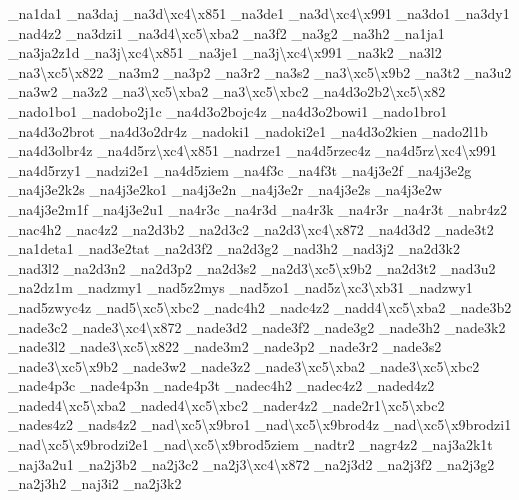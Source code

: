 \begin{DoxyCompactItemize}
\-\_\-na1da1 \-\_\-na3daj \-\_\-na3d\textbackslash{}xc4\textbackslash{}x851 \-\_\-na3de1 \-\_\-na3d\textbackslash{}xc4\textbackslash{}x991 \-\_\-na3do1 \-\_\-na3dy1 \-\_\-nad4z2 \-\_\-na3dzi1 \-\_\-na3d4\textbackslash{}xc5\textbackslash{}xba2 \-\_\-na3f2 \-\_\-na3g2 \-\_\-na3h2 \-\_\-na1ja1 \-\_\-na3ja2z1d \-\_\-na3j\textbackslash{}xc4\textbackslash{}x851 \-\_\-na3je1 \-\_\-na3j\textbackslash{}xc4\textbackslash{}x991 \-\_\-na3k2 \-\_\-na3l2 \-\_\-na3\textbackslash{}xc5\textbackslash{}x822 \-\_\-na3m2 \-\_\-na3p2 \-\_\-na3r2 \-\_\-na3s2 \-\_\-na3\textbackslash{}xc5\textbackslash{}x9b2 \-\_\-na3t2 \-\_\-na3u2 \-\_\-na3w2 \-\_\-na3z2 \-\_\-na3\textbackslash{}xc5\textbackslash{}xba2 \-\_\-na3\textbackslash{}xc5\textbackslash{}xbc2 \-\_\-na4d3o2b2\textbackslash{}xc5\textbackslash{}x82 \-\_\-nado1bo1 \-\_\-nadobo2j1c \-\_\-na4d3o2bojc4z \-\_\-na4d3o2bowi1 \-\_\-nado1bro1 \-\_\-na4d3o2brot \-\_\-na4d3o2dr4z \-\_\-nadoki1 \-\_\-nadoki2e1 \-\_\-na4d3o2kien \-\_\-nado2l1b \-\_\-na4d3olbr4z \-\_\-na4d5rz\textbackslash{}xc4\textbackslash{}x851 \-\_\-nadrze1 \-\_\-na4d5rzec4z \-\_\-na4d5rz\textbackslash{}xc4\textbackslash{}x991 \-\_\-na4d5rzy1 \-\_\-nadzi2e1 \-\_\-na4d5ziem \-\_\-na4f3c \-\_\-na4f3t \-\_\-na4j3e2f \-\_\-na4j3e2g \-\_\-na4j3e2k2s \-\_\-na4j3e2ko1 \-\_\-na4j3e2n \-\_\-na4j3e2r \-\_\-na4j3e2s \-\_\-na4j3e2w \-\_\-na4j3e2m1f \-\_\-na4j3e2u1 \-\_\-na4r3c \-\_\-na4r3d \-\_\-na4r3k \-\_\-na4r3r \-\_\-na4r3t \-\_\-nabr4z2 \-\_\-nac4h2 \-\_\-nac4z2 \-\_\-na2d3b2 \-\_\-na2d3c2 \-\_\-na2d3\textbackslash{}xc4\textbackslash{}x872 \-\_\-na4d3d2 \-\_\-nade3t2 \-\_\-na1deta1 \-\_\-nad3e2tat \-\_\-na2d3f2 \-\_\-na2d3g2 \-\_\-nad3h2 \-\_\-nad3j2 \-\_\-na2d3k2 \-\_\-nad3l2 \-\_\-na2d3n2 \-\_\-na2d3p2 \-\_\-na2d3s2 \-\_\-na2d3\textbackslash{}xc5\textbackslash{}x9b2 \-\_\-na2d3t2 \-\_\-nad3u2 \-\_\-na2dz1m \-\_\-nadzmy1 \-\_\-nad5z2mys \-\_\-nad5zo1 \-\_\-nad5z\textbackslash{}xc3\textbackslash{}xb31 \-\_\-nadzwy1 \-\_\-nad5zwyc4z \-\_\-nad5\textbackslash{}xc5\textbackslash{}xbc2 \-\_\-nadc4h2 \-\_\-nadc4z2 \-\_\-nadd4\textbackslash{}xc5\textbackslash{}xba2 \-\_\-nade3b2 \-\_\-nade3c2 \-\_\-nade3\textbackslash{}xc4\textbackslash{}x872 \-\_\-nade3d2 \-\_\-nade3f2 \-\_\-nade3g2 \-\_\-nade3h2 \-\_\-nade3k2 \-\_\-nade3l2 \-\_\-nade3\textbackslash{}xc5\textbackslash{}x822 \-\_\-nade3m2 \-\_\-nade3p2 \-\_\-nade3r2 \-\_\-nade3s2 \-\_\-nade3\textbackslash{}xc5\textbackslash{}x9b2 \-\_\-nade3w2 \-\_\-nade3z2 \-\_\-nade3\textbackslash{}xc5\textbackslash{}xba2 \-\_\-nade3\textbackslash{}xc5\textbackslash{}xbc2 \-\_\-nade4p3c \-\_\-nade4p3n \-\_\-nade4p3t \-\_\-nadec4h2 \-\_\-nadec4z2 \-\_\-naded4z2 \-\_\-naded4\textbackslash{}xc5\textbackslash{}xba2 \-\_\-naded4\textbackslash{}xc5\textbackslash{}xbc2 \-\_\-nader4z2 \-\_\-nade2r1\textbackslash{}xc5\textbackslash{}xbc2 \-\_\-nades4z2 \-\_\-nads4z2 \-\_\-nad\textbackslash{}xc5\textbackslash{}x9bro1 \-\_\-nad\textbackslash{}xc5\textbackslash{}x9brod4z \-\_\-nad\textbackslash{}xc5\textbackslash{}x9brodzi1 \-\_\-nad\textbackslash{}xc5\textbackslash{}x9brodzi2e1 \-\_\-nad\textbackslash{}xc5\textbackslash{}x9brod5ziem \-\_\-nadtr2 \-\_\-nagr4z2 \-\_\-naj3a2k1t \-\_\-naj3a2u1 \-\_\-na2j3b2 \-\_\-na2j3c2 \-\_\-na2j3\textbackslash{}xc4\textbackslash{}x872 \-\_\-na2j3d2 \-\_\-na2j3f2 \-\_\-na2j3g2 \-\_\-na2j3h2 \-\_\-naj3i2 \-\_\-na2j3k2 
\end{DoxyCompactItemize}
